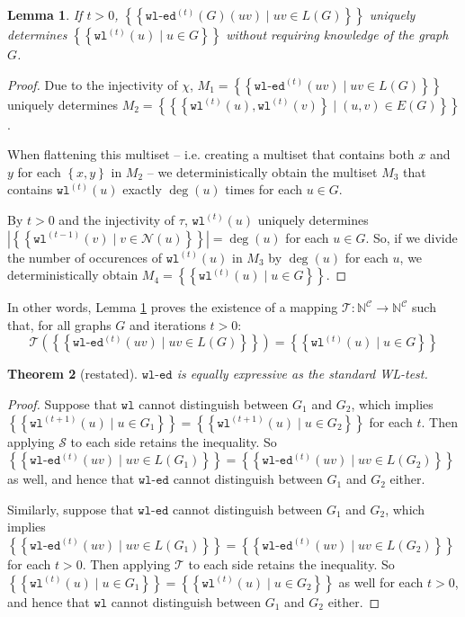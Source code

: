 \documentclass{article}
\newtheorem{theorem}{Theorem}
\newtheorem{lemma}[theorem]{Lemma}
\newcommand{\set}[1]{\left\{#1\right\}}
\newcommand{\multiset}[1]{\left\{\!\!\left\{#1\right\}\!\!\right\}}
\newcommand{\iter}[1]{^{(#1)}}
\newcommand{\wl}{\texttt{wl}}
\newcommand{\wledge}{\texttt{wl-ed}}
\newcommand{\dec}{\chi}
\newcommand{\hash}{\tau}
\newcommand{\nbh}{\mathcal{N}}
\newcommand{\mcc}{\mathcal{C}}
\newcommand{\mcs}{\mathcal{S}}
\newcommand{\mct}{\mathcal{T}}
\newcommand{\mbn}{\mathbb{N}}
\begin{document}
\begin{lemma}   \label{lemma:wledge-determines-wl}
    If $t>0$, $\multiset{\wledge\iter{t}(G)(uv) \mid uv\in L(G)}$ uniquely determines $\multiset{\wl\iter{t}(u) \mid u\in G}$ without requiring knowledge of the graph $G$.
\end{lemma}
\begin{proof}
    Due to the injectivity of $\dec$,
    $M_1 = \multiset{\wledge\iter{t}(uv) \mid uv\in L(G)}$
    uniquely determines
    $M_2 = \multiset{\set{\wl\iter{t}(u), \wl\iter{t}(v)} \mid (u,v)\in E(G)}$.

    When flattening this multiset -- i.e. creating a multiset that contains both $x$ and $y$ for each $\set{x,y}$ in $M_2$ -- we deterministically obtain the multiset $M_3$ that contains $\wl\iter{t}(u)$ exactly $\deg(u)$ times for each $u\in G$.

    By $t>0$ and the injectivity of $\hash$, $\wl\iter{t}(u)$ uniquely determines $\left\lvert\multiset{\wl\iter{t-1}(v) \mid v\in \nbh(u)}\right\rvert = \deg(u)$ for each $u\in G$. So, if we divide the number of occurences of $\wl\iter{t}(u)$ in $M_3$ by $\deg(u)$ for each $u$, we deterministically obtain $M_4 = \multiset{\wl\iter{t}(u) \mid u\in G}$.
\end{proof}
In other words, Lemma \ref{lemma:wledge-determines-wl} proves the existence of a mapping $\mct: \mbn^\mcc \rightarrow \mbn^\mcc$ such that, for all graphs $G$ and iterations $t>0$:
\begin{equation}
    \mct\left(\multiset{\wledge\iter{t}(uv) \mid uv\in L(G)}\right) = \multiset{\wl\iter{t}(u) \mid u\in G}
\end{equation}



\begingroup
\def\thetheorem{\ref{thm:wledge-equal-to-wl}}
\begin{theorem}[restated]
    $\wledge$ is equally expressive as the standard WL-test.
\end{theorem}
\addtocounter{theorem}{-1}
\endgroup

\begin{proof}
    Suppose that $\wl$ cannot distinguish between $G_1$ and $G_2$, which implies $\multiset{\wl\iter{t+1}(u) \mid u\in G_1} = \multiset{\wl\iter{t+1}(u) \mid u\in G_2}$ for each $t$.
    Then applying $\mcs$ to each side retains the inequality. So $\multiset{\wledge\iter{t}(uv) \mid uv\in L(G_1)} = \multiset{\wledge\iter{t}(uv) \mid uv\in L(G_2)}$ as well, and hence that $\wledge$ cannot distinguish between $G_1$ and $G_2$ either.

    Similarly, suppose that $\wledge$ cannot distinguish between $G_1$ and $G_2$, which implies $\multiset{\wledge\iter{t}(uv) \mid uv\in L(G_1)} = \multiset{\wledge\iter{t}(uv) \mid uv\in L(G_2)}$ for each $t>0$.
    Then applying $\mct$ to each side retains the inequality. So $\multiset{\wl\iter{t}(u) \mid u\in G_1} = \multiset{\wl\iter{t}(u) \mid u\in G_2}$ as well for each $t>0$, and hence that $\wl$ cannot distinguish between $G_1$ and $G_2$ either.
\end{proof}
\end{document}
